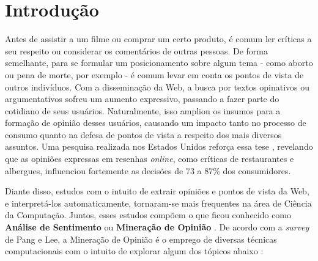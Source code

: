 \chapter{Introdução}



Antes de assistir a um filme ou comprar um certo produto, é comum ler críticas a seu respeito ou considerar os comentários de outras pessoas. De forma semelhante, para se formular um posicionamento sobre algum tema - como aborto ou pena de morte, por exemplo - é comum levar em conta os pontos de vista de outros indivíduos. Com a disseminação da Web, a busca por textos opinativos ou argumentativos sofreu um aumento expressivo, passando a fazer parte do cotidiano de seus usuários. Naturalmente, isso ampliou os insumos para a formação de opinião desses usuários, causando um impacto tanto no processo de consumo quanto na defesa de pontos de vista a respeito dos mais diversos assuntos. Uma pesquisa realizada nos Estados Unidos reforça essa tese \cite{pesquisa-eua}, revelando que as opiniões expressas em resenhas \emph{online}, como críticas de restaurantes e albergues, influenciou fortemente as decisões de 73 a 87\% dos consumidores.

Diante disso, estudos com o intuito de extrair opiniões e pontos de vista da Web, e interpretá-los automaticamente, tornaram-se mais frequentes na área de Ciência da Computação. Juntos, esses estudos compõem o que ficou conhecido como \textbf{Análise de Sentimento} ou \textbf{Mineração de Opinião} \cite{omsa,bingliu}. De acordo com a \emph{survey} de Pang e Lee, a Mineração de Opinião é o emprego de diversas técnicas computacionais com o intuito de explorar algum dos tópicos abaixo \cite{omsa}:


   



